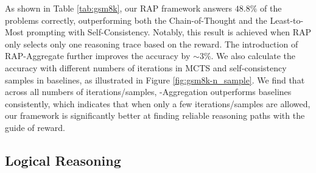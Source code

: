 As shown in Table \ref{tab:gsm8k}, our RAP framework answers $48.8\%$ of the problems correctly, outperforming both the Chain-of-Thought and the Least-to-Most prompting with Self-Consistency. Notably, this result is achieved when RAP only selects only one reasoning trace based on the reward.
The introduction of RAP-Aggregate further improves the accuracy by $\sim 3\%$.
We also calculate the accuracy with different numbers of iterations in MCTS and self-consistency samples in baselines, as illustrated in Figure \ref{fig:gsm8k-n_sample}.
We find that across all numbers of iterations/samples, \ours-Aggregation outperforms baselines consistently, which indicates that when only a few iterations/samples are allowed, our framework is significantly better at finding reliable reasoning paths with the guide of reward. 

\subsection{Logical Reasoning} \label{sec:logical}



